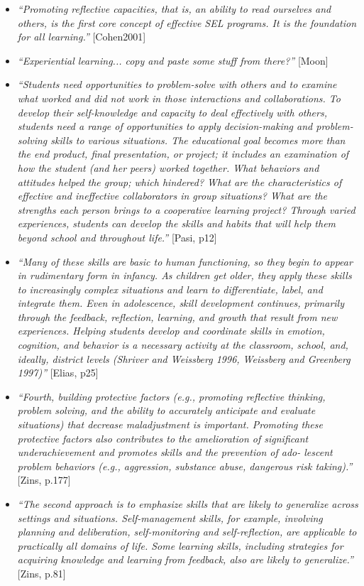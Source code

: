 \documentclass[prodmode,acmtochi]{acmsmall}
\newcommand{\qq}[2]{\textrm{\textit{``#2''}}{ [#1]}}
\begin{document}
\begin{itemize}
	\item \qq{Cohen2001}{Promoting reflective capacities, that is, an ability to read ourselves and others, is the first core concept of effective SEL programs. It is the foundation for all learning.}
	\item \qq{Moon}{Experiential learning... copy and paste some stuff from there?}
	\item \qq{Pasi, p12}{Students need opportunities to problem-solve with others and to examine what worked and did not work in those interactions and collaborations. To develop their self-knowledge and capacity to deal effectively with others, students need a range of opportunities to apply decision-making and problem-solving skills to various situations. The educational goal becomes more than the end product, final presentation, or project; it includes an examination of how the student (and her peers) worked together. What behaviors and attitudes helped the group; which hindered? What are the characteristics of effective and ineffective collaborators in group situations? What are the strengths each person brings to a cooperative learning project? Through varied experiences, students can develop the skills and habits that will help them beyond school and throughout life.}

	\item \qq{Elias, p25}{Many of these skills are basic to human functioning, so they begin to appear in rudimentary form in infancy. As children get older, they apply these skills to increasingly complex situations and learn to differentiate, label, and integrate them. Even in adolescence, skill development continues, primarily through the feedback, reflection, learning, and growth that result from new experiences. Helping students develop and coordinate skills in emotion, cognition, and behavior is a necessary activity at the classroom, school, and, ideally, district levels (Shriver and Weissberg 1996, Weissberg and Greenberg 1997)}
	\item \qq{Zins, p.177}{Fourth, building protective factors (e.g., promoting reflective thinking, problem solving, and the ability to accurately anticipate and evaluate situations) that decrease maladjustment is important. Promoting these protective factors also contributes to the amelioration of significant underachievement and promotes skills and the prevention of ado- lescent problem behaviors (e.g., aggression, substance abuse, dangerous risk taking).}
	\item \qq{Zins, p.81}{The second approach is to emphasize skills that are likely to generalize across settings and situations. Self-management skills, for example, involving planning and deliberation, self-monitoring and self-reflection, are applicable to practically all domains of life. Some learning skills, including strategies for acquiring knowledge and learning from feedback, also are likely to generalize.}

\end{itemize}
\end{document}
